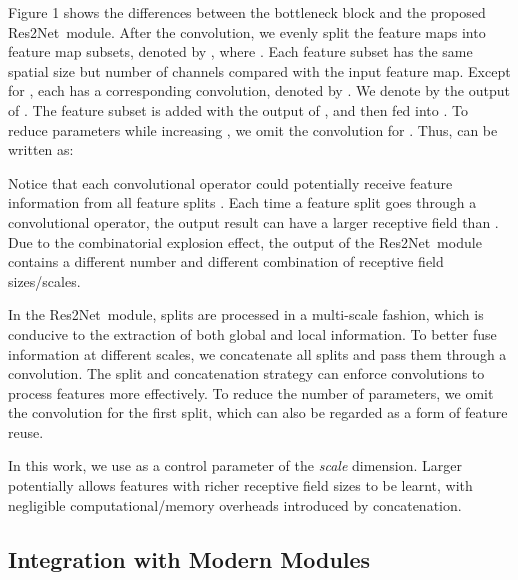 \documentclass[10pt,journal,cspaper,compsoc]{IEEEtran}
\newcommand{\CheckRmv}[1]{}
\newcommand{\figref}[1]{Figure 1}\newcommand{\tabref}[1]{Table 1}\newcommand{\secref}[1]{Section 1}
\newcommand{\CheckRmv}[1]{#1}
\newcommand{\figref}[1]{Fig.~\ref{#1}}\newcommand{\tabref}[1]{Table~\ref{#1}}\newcommand{\secref}[1]{Sec.~\ref{#1}}
\newcommand{\ourM}{{Res2Net}}
\begin{document}
\figref{fig:structure} shows the differences between the bottleneck block 
and the proposed \ourM~module.
After the  convolution,
we evenly split the feature maps into  feature map subsets,
denoted by , where .
Each feature subset  has the same spatial size
but  number of channels compared with the input feature map.
Except for , each  has a corresponding
 convolution,
denoted by .
We denote by  the output of .
The feature subset  is added with the output of
, and then fed into .
To reduce parameters while increasing ,
we omit the  convolution for .
Thus,  can be written as:
\CheckRmv{

}


Notice that each  convolutional operator 
could potentially receive feature information from all feature splits
. 
Each time a feature split  goes through a 
convolutional operator,
the output result can have a larger receptive field than .
Due to the combinatorial explosion effect,
the output of the \ourM~module contains a different number and 
different combination of receptive field sizes/scales.


In the \ourM~module,
splits are processed in a multi-scale fashion,
which is conducive to the extraction of both global and local information.
To better fuse information at different scales,
we concatenate all splits and pass them through a  convolution.
The split and concatenation strategy
can enforce convolutions
to process features more effectively.
To reduce the  number of parameters, we omit the convolution for the first split,
which can also be regarded as a form of feature reuse.


In this work,  we use  as a control parameter of the \emph{scale} dimension.
Larger  potentially allows features 
with richer receptive field sizes to be learnt,
with negligible computational/memory overheads introduced by concatenation.




\subsection{Integration with Modern Modules}

\CheckRmv{
\begin{figure}[t]
  \begin{overpic}[width=\linewidth]{improved_structure.pdf}
  \end{overpic}
  \caption{The \ourM~module can be integrated with
    the dimension cardinality~\cite{xie2017aggregated} (replace conv with group conv)
    and SE~\cite{hu2018senet} blocks.
  }\label{fig:improved_structure}
\end{figure}
}
\end{document}
